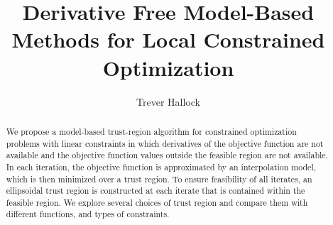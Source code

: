 \documentclass{article}
\title{Derivative Free Model-Based Methods for Local Constrained Optimization}
\author{Trever Hallock}
\begin{document}
\maketitle

\begin{abstract}

We propose a model-based trust-region algorithm for constrained optimization problems with linear constraints in which derivatives of the objective function are not available and the objective function values outside the feasible region are not available.
In each iteration, the objective function is approximated by an interpolation model, which is then minimized over a trust region.
To ensure feasibility of all iterates, an ellipsoidal trust region is constructed at each iterate that is contained within the feasible region.
We explore several choices of trust region and compare them with different functions, and types of constraints.

\end{abstract}

\newpage

\tableofcontents

\newpage



\newpage

\appendix







\end{document}
